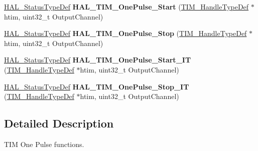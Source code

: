 \begin{DoxyCompactItemize}
\item 
\mbox{\label{group___t_i_m___exported___functions___group5_ga40e43e4f2484df59079e0316d6a6fd23}} 
\mbox{\hyperlink{stm32f7xx__hal__def_8h_a63c0679d1cb8b8c684fbb0632743478f}{H\+A\+L\+\_\+\+Status\+Type\+Def}} {\bfseries H\+A\+L\+\_\+\+T\+I\+M\+\_\+\+One\+Pulse\+\_\+\+Start} (\mbox{\hyperlink{struct_t_i_m___handle_type_def}{T\+I\+M\+\_\+\+Handle\+Type\+Def}} $\ast$htim, uint32\+\_\+t Output\+Channel)
\item 
\mbox{\label{group___t_i_m___exported___functions___group5_gac7744a2a063e8bf2909319d70fc764fd}} 
\mbox{\hyperlink{stm32f7xx__hal__def_8h_a63c0679d1cb8b8c684fbb0632743478f}{H\+A\+L\+\_\+\+Status\+Type\+Def}} {\bfseries H\+A\+L\+\_\+\+T\+I\+M\+\_\+\+One\+Pulse\+\_\+\+Stop} (\mbox{\hyperlink{struct_t_i_m___handle_type_def}{T\+I\+M\+\_\+\+Handle\+Type\+Def}} $\ast$htim, uint32\+\_\+t Output\+Channel)
\item 
\mbox{\label{group___t_i_m___exported___functions___group5_gafcde302725d20c6f992f26660d491bb9}} 
\mbox{\hyperlink{stm32f7xx__hal__def_8h_a63c0679d1cb8b8c684fbb0632743478f}{H\+A\+L\+\_\+\+Status\+Type\+Def}} {\bfseries H\+A\+L\+\_\+\+T\+I\+M\+\_\+\+One\+Pulse\+\_\+\+Start\+\_\+\+IT} (\mbox{\hyperlink{struct_t_i_m___handle_type_def}{T\+I\+M\+\_\+\+Handle\+Type\+Def}} $\ast$htim, uint32\+\_\+t Output\+Channel)
\item 
\mbox{\label{group___t_i_m___exported___functions___group5_ga6bbce5414404228fde71dadd8d1cddc7}} 
\mbox{\hyperlink{stm32f7xx__hal__def_8h_a63c0679d1cb8b8c684fbb0632743478f}{H\+A\+L\+\_\+\+Status\+Type\+Def}} {\bfseries H\+A\+L\+\_\+\+T\+I\+M\+\_\+\+One\+Pulse\+\_\+\+Stop\+\_\+\+IT} (\mbox{\hyperlink{struct_t_i_m___handle_type_def}{T\+I\+M\+\_\+\+Handle\+Type\+Def}} $\ast$htim, uint32\+\_\+t Output\+Channel)
\end{DoxyCompactItemize}


\subsection{Detailed Description}
T\+IM One Pulse functions. 

